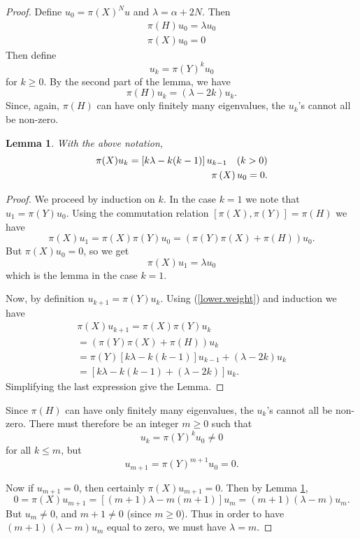 \documentclass{amsbook}
\theoremstyle{plain}
\newtheorem{lemma}[theorem]{Lemma}
\numberwithin{equation}{chapter}
\numberwithin{theorem}{chapter}
\begin{document}
\begin{proof}
Define $u_{0}=\pi(X)^{N}u$ and $\lambda=\alpha+2N$. Then
\begin{align}
\pi(H)u_{0}=\lambda u_{0}\label{weight}\\
\pi(X)u_{0}=0\label{kill}%
\end{align}
Then define
\[
u_{k}=\pi(Y)^{k}u_{0}%
\]
for $k\geq0$. By the second part of the lemma, we have
\begin{equation}
\pi(H)u_{k}=\left(  \lambda-2k\right)  u_{k}\text{.}\label{lower.weight}%
\end{equation}
Since, again, $\pi(H)$ can have only finitely many eigenvalues, the $u_{k}$'s
cannot all be non-zero.

\begin{lemma}
\label{raising}With the above notation,
\begin{align*}
\pi(X)u_{k}=\left[  k\lambda-k(k-1)\right]  u_{k-1}\text{\quad}(k>0)\\
\pi\left(  X\right)  u_{0}=0.
\end{align*}
\end{lemma}

\begin{proof}
We proceed by induction on $k$. In the case $k=1$ we note that $u_{1}%
=\pi(Y)u_{0}$. Using the commutation relation $\left[  \pi(X),\pi(Y)\right]
=\pi(H)$ we have
\[
\pi(X)u_{1}=\pi(X)\pi(Y)u_{0}=\left(  \pi(Y)\pi(X)+\pi(H)\right)
u_{0}\text{.}%
\]
But $\pi(X)u_{0}=0$, so we get
\[
\pi(X)u_{1}=\lambda u_{0}%
\]
which is the lemma in the case $k=1$.

Now, by definition $u_{k+1}=\pi(Y)u_{k}$. Using (\ref{lower.weight}) and
induction we have
\begin{align*}
\pi(X)u_{k+1}=\pi(X)\pi(Y)u_{k}\\
=\left(  \pi(Y)\pi(X)+\pi(H)\right)  u_{k}\\
=\pi(Y)\left[  k\lambda-k(k-1)\right]  u_{k-1}+(\lambda-2k)u_{k}\\
=\left[  k\lambda-k(k-1)+(\lambda-2k)\right]  u_{k}\text{.}%
\end{align*}
Simplifying the last expression give the Lemma.
\end{proof}

Since $\pi(H)$ can have only finitely many eigenvalues, the $u_{k}$'s cannot
all be non-zero. There must therefore be an integer $m\geq0$ such that
\[
u_{k}=\pi(Y)^{k}u_{0}\neq0
\]
for all $k\leq m$, but
\[
u_{m+1}=\pi(Y)^{m+1}u_{0}=0\text{.}%
\]

Now if $u_{m+1}=0$, then certainly $\pi(X)u_{m+1}=0$. Then by Lemma
\ref{raising},
\[
0=\pi(X)u_{m+1}=\left[  (m+1)\lambda-m(m+1)\right]  u_{m}=(m+1)(\lambda
-m)u_{m}\text{.}%
\]
But $u_{m}\neq0$, and $m+1\neq0$ (since $m\geq0$). Thus in order to have
$(m+1)(\lambda-m)u_{m}$ equal to zero, we must have $\lambda=m$.


\end{proof}
\end{document}
